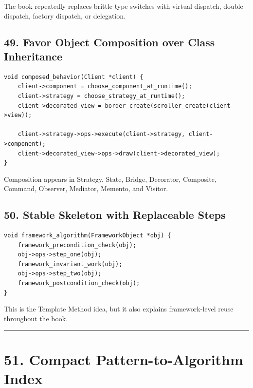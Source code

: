 \documentclass[11pt]{article}
\begin{document}
The book repeatedly replaces brittle type switches with virtual dispatch, double dispatch, factory dispatch, or delegation.

\subsection{49. Favor Object Composition over Class Inheritance}\label{favor-object-composition-over-class-inheritance}

\begin{verbatim}
void composed_behavior(Client *client) {
    client->component = choose_component_at_runtime();
    client->strategy = choose_strategy_at_runtime();
    client->decorated_view = border_create(scroller_create(client->view));

    client->strategy->ops->execute(client->strategy, client->component);
    client->decorated_view->ops->draw(client->decorated_view);
}
\end{verbatim}

Composition appears in Strategy, State, Bridge, Decorator, Composite, Command, Observer, Mediator, Memento, and Visitor.

\subsection{50. Stable Skeleton with Replaceable Steps}\label{stable-skeleton-with-replaceable-steps}

\begin{verbatim}
void framework_algorithm(FrameworkObject *obj) {
    framework_precondition_check(obj);
    obj->ops->step_one(obj);
    framework_invariant_work(obj);
    obj->ops->step_two(obj);
    framework_postcondition_check(obj);
}
\end{verbatim}

This is the Template Method idea, but it also explains framework-level reuse throughout the book.

\begin{center}\rule{0.5\linewidth}{0.5pt}\end{center}

\section{51. Compact Pattern-to-Algorithm Index}\label{compact-pattern-to-algorithm-index}
\end{document}
